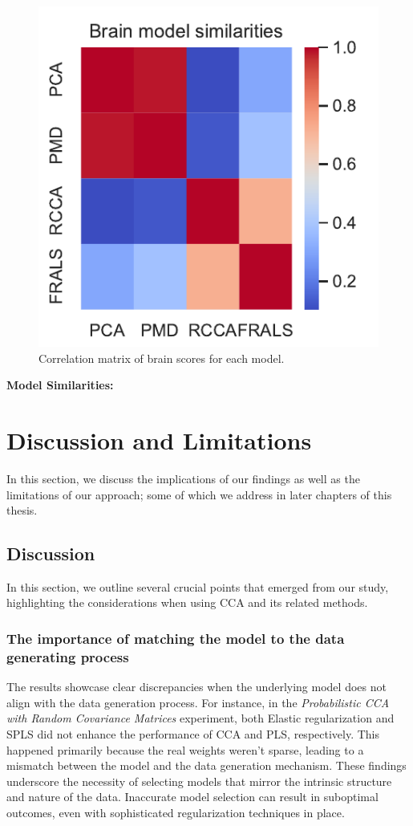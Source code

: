 \begin{figure}
\centering
\includegraphics[width=0.49\linewidth]{figures/regularization/hcp/brain_model_similarities}
\caption{Correlation matrix of brain scores for each model.}
\label{fig:brainsimilarities}
\end{figure}

\textbf{Model Similarities:}

\section{Discussion and Limitations}

In this section, we discuss the implications of our findings as well as the limitations of our approach; some of which we address in later chapters of this thesis.

\subsection{Discussion}

In this section, we outline several crucial points that emerged from our study, highlighting the considerations when using CCA and its related methods.

\subsubsection{The importance of matching the model to the data generating process}

The results showcase clear discrepancies when the underlying model does not align with the data generation process. For instance, in the \textit{Probabilistic CCA with Random Covariance Matrices} experiment, both Elastic regularization and SPLS did not enhance the performance of CCA and PLS, respectively.
This happened primarily because the real weights weren't sparse, leading to a mismatch between the model and the data generation mechanism.
These findings underscore the necessity of selecting models that mirror the intrinsic structure and nature of the data.
Inaccurate model selection can result in suboptimal outcomes, even with sophisticated regularization techniques in place.

